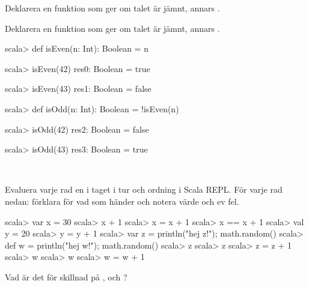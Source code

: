 \Subtask Deklarera en funktion  som ger  om talet  är jämnt, annars .

\Subtask Deklarera en funktion  som ger  om talet  är jämnt, annars .

\SOLUTION


\TaskSolved \what

\SubtaskSolved
\begin{REPL}
scala> def isEven(n: Int): Boolean = n %

scala> isEven(42)
res0: Boolean = true

scala> isEven(43)
res1: Boolean = false

\end{REPL}


\SubtaskSolved
\begin{REPL}
scala> def isOdd(n: Int): Boolean = !isEven(n)

scala> isOdd(42)
res2: Boolean = false

scala> isOdd(43)
res3: Boolean = true
\end{REPL}


\QUESTEND






\QUESTBEGIN

\Task \what~

\Subtask
 Evaluera varje rad en i taget i tur och ordning i Scala REPL. För varje rad nedan: förklara för vad som händer och notera värde och ev fel. %
\begin{REPL}
scala> var x = 30
scala> x + 1
scala> x = x + 1
scala> x == x + 1
scala> val y = 20
scala> y = y + 1
scala> var z = { println("hej z!"); math.random() }
scala> def w = { println("hej w!"); math.random() }
scala> z
scala> z
scala> z = z + 1
scala> w
scala> w
scala> w = w + 1
\end{REPL}


\Subtask Vad är det för skillnad på ,  och ?



\SOLUTION

\TaskSolved \what

